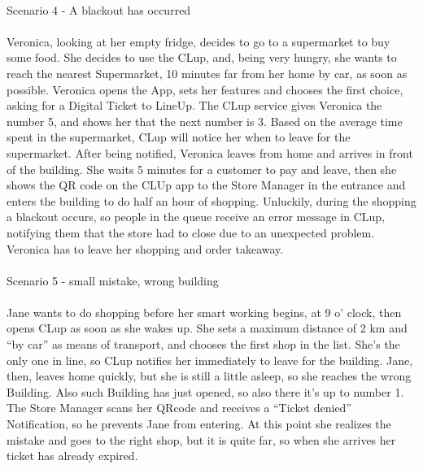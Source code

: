 \documentclass{article}
\begin{document}
	\\
	{\large{Scenario 4 - A blackout has occurred} }\\
	\\
	Veronica, looking at her empty fridge, decides to go to a supermarket to buy some food. She decides to use the CLup, and, being very hungry, she wants to reach the nearest Supermarket, 10 minutes far from her home by car, as soon as possible.
Veronica opens the App, sets her features and chooses the first choice, asking for a Digital Ticket to LineUp.
The CLup service gives Veronica the number 5, and shows her that the next number is 3. Based on the average time spent in the supermarket, CLup will notice her when to leave for the supermarket.
After being notified, Veronica leaves from home and arrives in front of the building.
She waits 5 minutes for a customer to pay and leave, then she shows the QR code on the CLUp app to the Store Manager in the entrance and enters the building to do half an hour of shopping. 
Unluckily, during the shopping a blackout occurs, so people in the queue receive an error message in CLup, notifying them that the store had to close due to an unexpected problem. Veronica has to leave her shopping and order takeaway. \\
\\
	{\large{Scenario 5 - small mistake, wrong building}} \\
	\\
	Jane wants to do shopping before her smart working begins, at 9 o’ clock, then opens CLup as soon as she wakes up. She sets a maximum distance of 2 km and “by car” as means of transport, and chooses the first shop in the list. She’s the only one in line, so CLup notifies her immediately to leave for the building. Jane, then, leaves home quickly, but she is still a little asleep, so she reaches the wrong Building. Also such Building has just opened, so also there it's up to number 1. The Store Manager scans her QRcode and receives a “Ticket denied'' Notification, so he prevents Jane from entering. At this point she realizes the mistake and goes to the right shop, but it is quite far, so when she arrives her ticket has already expired. \\
\end{document}

